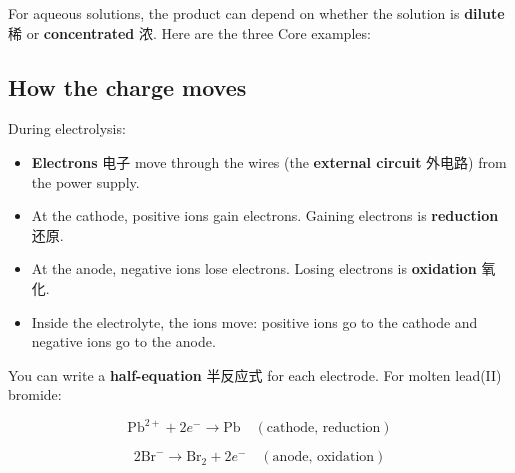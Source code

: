 \documentclass[11pt]{article}
\begin{document}
For aqueous solutions, the product can depend on whether the solution is \textbf{dilute} 稀 or \textbf{concentrated} 浓. Here are the three Core examples:

\begin{center}
\end{center}

\subsection*{How the charge moves}

During electrolysis:

\begin{itemize}
\item \textbf{Electrons} 电子 move through the wires (the \textbf{external circuit} 外电路) from the power supply.

\item At the cathode, positive ions gain electrons. Gaining electrons is \textbf{reduction} 还原.

\item At the anode, negative ions lose electrons. Losing electrons is \textbf{oxidation} 氧化.

\item Inside the electrolyte, the ions move: positive ions go to the cathode and negative ions go to the anode.

\end{itemize}

You can write a \textbf{half-equation} 半反应式 for each electrode. For molten lead(II) bromide:

\[
\text{Pb}^{2+} + 2e^{-} \rightarrow \text{Pb} \quad (\text{cathode, reduction})
\]

\[
2\text{Br}^{-} \rightarrow \text{Br}_2 + 2e^{-} \quad (\text{anode, oxidation})
\]
\end{document}
